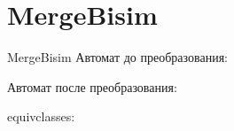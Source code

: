 \section{MergeBisim}
\begin{frame}{MergeBisim}
	Автомат до преобразования:


	Автомат после преобразования:


	equivclasses:


\end{frame}
